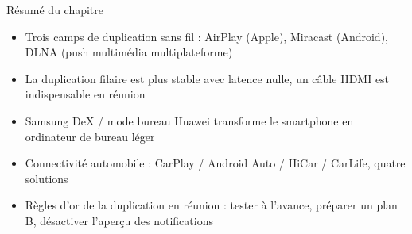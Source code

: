 \begin{tcbsummary}{Résumé du chapitre}
\begin{itemize}
  \item Trois camps de duplication sans fil : AirPlay (Apple), Miracast (Android), DLNA (push multimédia multiplateforme)
  \item La duplication filaire est plus stable avec latence nulle, un câble HDMI est indispensable en réunion
  \item Samsung DeX / mode bureau Huawei transforme le smartphone en ordinateur de bureau léger
  \item Connectivité automobile : CarPlay / Android Auto / HiCar / CarLife, quatre solutions
  \item Règles d'or de la duplication en réunion : tester à l'avance, préparer un plan B, désactiver l'aperçu des notifications
\end{itemize}

\end{tcbsummary}
